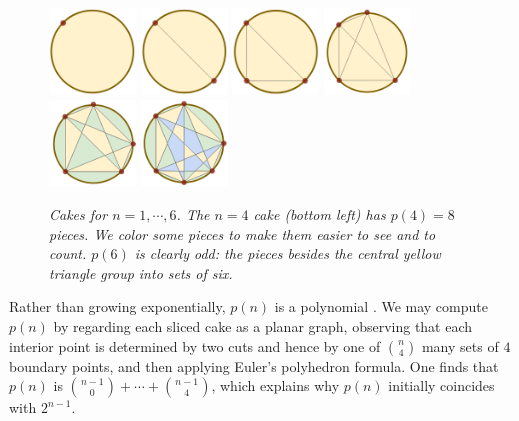 \documentclass[twocolumn]{article}
\theoremstyle{definition}
\begin{document}
        \begin{figure}[h!]
            \centering
            \includegraphics[height=2.3cm]{cake-1}
            \includegraphics[height=2.3cm]{cake-2}
            \includegraphics[height=2.3cm]{cake-3}
            \includegraphics[height=2.3cm]{cake-4}
            \includegraphics[height=2.3cm]{cake-5-col}
            \includegraphics[height=2.3cm]{cake-6-col}
            \caption{\emph{
                Cakes for $n=1, \cdots, 6$.
                The $n=4$ cake (bottom left) has $p(4)=8$ pieces.  We
                color some pieces to make them easier to see and
                to count.  $p(6)$ is clearly odd: the
                pieces besides the central yellow triangle group into sets
                of six.
            }}
        \end{figure}

        Rather than growing exponentially, $p(n)$ is a polynomial \cite{wetzel}.  We may
        compute $p(n)$ by regarding each sliced cake as a planar graph,
        observing that each interior point is determined by two cuts and hence
        by one of ${n\choose 4}$ many sets of $4$ boundary points, and then
        applying Euler's polyhedron formula.  One finds that $p(n)$ is ${n-1
        \choose 0}+\cdots+{n-1\choose 4}$, which explains why $p(n)$ initially
        coincides with $2^{n-1}$.
\end{document}
